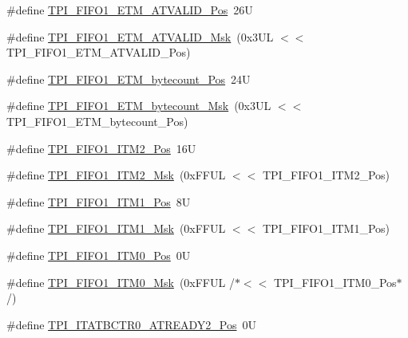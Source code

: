 \begin{DoxyCompactItemize}
\item 
\#define \hyperlink{group___c_m_s_i_s___t_p_i_ga3177b8d815cf4a707a2d3d3d5499315d}{T\+P\+I\+\_\+\+F\+I\+F\+O1\+\_\+\+E\+T\+M\+\_\+\+A\+T\+V\+A\+L\+I\+D\+\_\+\+Pos}~26U
\item 
\#define \hyperlink{group___c_m_s_i_s___t_p_i_ga0e8f29a1e9378d1ceb0708035edbb86d}{T\+P\+I\+\_\+\+F\+I\+F\+O1\+\_\+\+E\+T\+M\+\_\+\+A\+T\+V\+A\+L\+I\+D\+\_\+\+Msk}~(0x3\+U\+L $<$$<$ T\+P\+I\+\_\+\+F\+I\+F\+O1\+\_\+\+E\+T\+M\+\_\+\+A\+T\+V\+A\+L\+I\+D\+\_\+\+Pos)
\item 
\#define \hyperlink{group___c_m_s_i_s___t_p_i_gaab31238152b5691af633a7475eaf1f06}{T\+P\+I\+\_\+\+F\+I\+F\+O1\+\_\+\+E\+T\+M\+\_\+bytecount\+\_\+\+Pos}~24U
\item 
\#define \hyperlink{group___c_m_s_i_s___t_p_i_gab554305459953b80554fdb1908b73291}{T\+P\+I\+\_\+\+F\+I\+F\+O1\+\_\+\+E\+T\+M\+\_\+bytecount\+\_\+\+Msk}~(0x3\+U\+L $<$$<$ T\+P\+I\+\_\+\+F\+I\+F\+O1\+\_\+\+E\+T\+M\+\_\+bytecount\+\_\+\+Pos)
\item 
\#define \hyperlink{group___c_m_s_i_s___t_p_i_ga1828c228f3940005f48fb8dd88ada35b}{T\+P\+I\+\_\+\+F\+I\+F\+O1\+\_\+\+I\+T\+M2\+\_\+\+Pos}~16U
\item 
\#define \hyperlink{group___c_m_s_i_s___t_p_i_gae54512f926ebc00f2e056232aa21d335}{T\+P\+I\+\_\+\+F\+I\+F\+O1\+\_\+\+I\+T\+M2\+\_\+\+Msk}~(0x\+F\+F\+U\+L $<$$<$ T\+P\+I\+\_\+\+F\+I\+F\+O1\+\_\+\+I\+T\+M2\+\_\+\+Pos)
\item 
\#define \hyperlink{group___c_m_s_i_s___t_p_i_gaece86ab513bc3d0e0a9dbd82258af49f}{T\+P\+I\+\_\+\+F\+I\+F\+O1\+\_\+\+I\+T\+M1\+\_\+\+Pos}~8U
\item 
\#define \hyperlink{group___c_m_s_i_s___t_p_i_ga3347f42828920dfe56e3130ad319a9e6}{T\+P\+I\+\_\+\+F\+I\+F\+O1\+\_\+\+I\+T\+M1\+\_\+\+Msk}~(0x\+F\+F\+U\+L $<$$<$ T\+P\+I\+\_\+\+F\+I\+F\+O1\+\_\+\+I\+T\+M1\+\_\+\+Pos)
\item 
\#define \hyperlink{group___c_m_s_i_s___t_p_i_ga2188671488417a52abb075bcd4d73440}{T\+P\+I\+\_\+\+F\+I\+F\+O1\+\_\+\+I\+T\+M0\+\_\+\+Pos}~0U
\item 
\#define \hyperlink{group___c_m_s_i_s___t_p_i_ga8ae09f544fc1a428797e2a150f14a4c9}{T\+P\+I\+\_\+\+F\+I\+F\+O1\+\_\+\+I\+T\+M0\+\_\+\+Msk}~(0x\+F\+F\+U\+L /$\ast$$<$$<$ T\+P\+I\+\_\+\+F\+I\+F\+O1\+\_\+\+I\+T\+M0\+\_\+\+Pos$\ast$/)
\item 
\#define \hyperlink{group___c_m_s_i_s___t_p_i_ga3f0249dfcfd58090c08fd4a0adea6b22}{T\+P\+I\+\_\+\+I\+T\+A\+T\+B\+C\+T\+R0\+\_\+\+A\+T\+R\+E\+A\+D\+Y2\+\_\+\+Pos}~0U
\item 

\end{DoxyCompactItemize}
